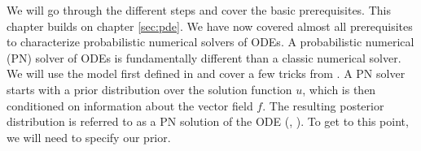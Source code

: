 \ifdefined\COMPILINGFROMMAIN
\else
    
    
\fi

We will go through the different steps and cover the basic prerequisites.
This chapter builds on chapter \ref{sec:pde}. We have now covered almost all prerequisites to characterize probabilistic numerical solvers of ODEs. A probabilistic numerical (PN) solver of ODEs is fundamentally different than a classic numerical solver. We will use the model first defined in \cite{invention_of_ODE_solver} and cover a few tricks from \cite{nicoThesis}. A PN solver starts with a prior distribution over the solution function $u$, which is then conditioned on information about the vector field $f$. The resulting posterior distribution is referred to as a PN solution of the ODE (\cite{nicoThesis}, \cite{exponential_probabilistic}). To get to this point, we will need to specify our prior.

